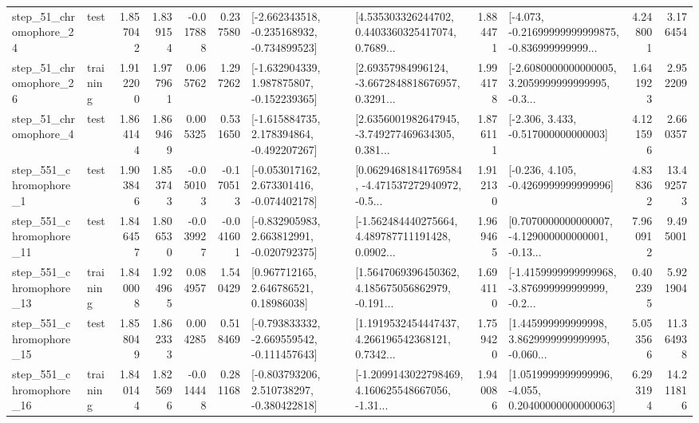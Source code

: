 \begin{tabular}{llrrrrllrlrr}
   step\_51\_chromophore\_24 &      test &      1.857042 &    1.839154 &     -0.017888 &  0.237580 &  [-2.662343518, -0.235168932, -0.734899523] &  [4.535303326244702, 0.4403360325417074, 0.7689... &       1.884471 &  [-4.073, -0.21699999999999875, -0.836999999999... &            4.248001 &          3.176454 \\
   step\_51\_chromophore\_26 &  training &      1.912200 &    1.977961 &      0.065762 &  1.297262 &   [-1.632904339, 1.987875807, -0.152239365] &  [2.69357984996124, -3.6672848818676957, 0.3291... &       1.994178 &  [-2.6080000000000005, 3.2059999999999995, -0.3... &            1.641923 &          2.952209 \\
    step\_51\_chromophore\_4 &      test &      1.864144 &    1.869469 &      0.005325 &  0.531650 &   [-1.615884735, 2.178394864, -0.492207267] &  [2.6356001982647945, -3.749277469634305, 0.381... &       1.876111 &                [-2.306, 3.433, -0.517000000000003] &            4.121596 &          2.660357 \\
   step\_551\_chromophore\_1 &      test &      1.903846 &    1.853743 &     -0.050103 & -0.170513 &   [-0.053017162, 2.673301416, -0.074402178] &  [0.06294681841769584, -4.471537272940972, -0.5... &       1.912130 &               [-0.236, 4.105, -0.4269999999999996] &            4.838362 &         13.492573 \\
  step\_551\_chromophore\_11 &      test &      1.846457 &    1.806530 &     -0.039927 & -0.041601 &   [-0.832905983, 2.663812991, -0.020792375] &  [-1.562484440275664, 4.489787711191428, 0.0902... &       1.969465 &  [0.7070000000000007, -4.129000000000001, -0.13... &            7.960912 &          9.495001 \\
  step\_551\_chromophore\_13 &  training &      1.840008 &    1.924965 &      0.084957 &  1.540429 &      [0.967712165, 2.646786521, 0.18986038] &  [1.5647069396450362, 4.185675056862979, -0.191... &       1.694110 &  [-1.4159999999999968, -3.876999999999999, -0.2... &            0.402395 &          5.921904 \\
  step\_551\_chromophore\_15 &      test &      1.858049 &    1.862333 &      0.004285 &  0.518469 &  [-0.793833332, -2.669559542, -0.111457643] &  [1.1919532454447437, 4.266196542368121, 0.7342... &       1.759420 &  [1.445999999999998, 3.8629999999999995, -0.060... &            5.053566 &         11.364938 \\
  step\_551\_chromophore\_16 &  training &      1.840144 &    1.825696 &     -0.014448 &  0.281168 &   [-0.803793206, 2.510738297, -0.380422818] &  [-1.2099143022798469, 4.160625548667056, -1.31... &       1.940086 &  [1.0519999999999996, -4.055, 0.20400000000000063] &            6.293194 &         14.211816 \\

\end{tabular}
